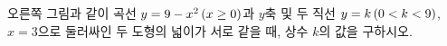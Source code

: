 \noindent\begin{minipage}[t]{0.58\linewidth}\vspace{0pt}\raggedright 오른쪽 그림과 같이 곡선 $y=9-x^2\mkern3mu (x\ge 0)$과 $y$축 및 두 직선 $y=k\mkern3mu (0<k<9)$, $x=3$으로 둘러싸인 두 도형의 넓이가 서로 같을 때, 상수 $k$의 값을 구하시오.\end{minipage}\hfill\begin{minipage}[t]{0.4\linewidth}\vspace{0pt}\centering \resizebox{\ifdim\width>\linewidth\linewidth\else\width\fi}{!}{}\end{minipage}\par

